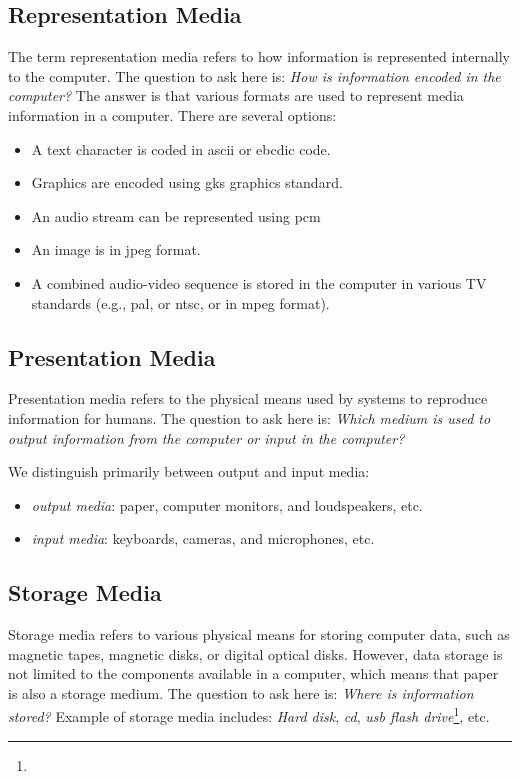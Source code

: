 \subsection{Representation Media}
The term representation media refers to how information is represented internally
to the computer. The question to ask here
is: \emph{How is information encoded in the computer?} The
answer is that various formats are used to represent media information in a computer. There are several options:

\begin{itemize}
\item A text character is coded in \gls{ascii} or \gls{ebcdic} code.
\item Graphics are encoded using \gls{gks} graphics standard.
\item An audio stream can be represented using \gls{pcm}
\item An image is in \gls{jpeg} format.
\item A combined audio-video sequence is stored in the computer in various TV standards (e.g., \gls{pal}, or \gls{ntsc}, or in \gls{mpeg} format).
\end{itemize}

\subsection{Presentation Media}
Presentation media refers to the physical means used by systems to reproduce information for humans. The question to ask here is: \emph{Which medium is used to output information
from the computer or input in the computer?}

We distinguish primarily between output and input media:
\begin{itemize}
	\item \textit{output media}: paper, computer monitors, and loudspeakers, etc.
	\item \textit{input media}: keyboards, cameras, and microphones, etc.
\end{itemize}


\subsection{Storage Media}
Storage media refers to various physical
means for storing computer data, such as magnetic tapes, magnetic disks, or digital
optical disks. However, data storage is not limited to the components available in a
computer, which means that paper is also a storage medium. The question to
ask here is: \emph{Where is information stored?} Example of storage media includes: \textit{Hard disk}, \textit{\gls{cd}}, \textit{\gls{usb} flash drive}\footnote{}, etc. 

